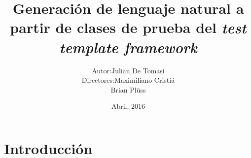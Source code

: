 \documentclass[pdf]{beamer}
\begin{document}
  
\title[NLG a partir de clases de prueba del TTF]{Generación de lenguaje natural a partir de clases de prueba del \textit{test template framework}}
\author[Julian De Tomasi]{\begin{tabular}{r@{ }l} 
  Autor:      & Julian De Tomasi \\[1ex]
  Directores: & Maximiliano Cristiá\\
  & Brian Plüss
  \end{tabular}}
\date{Abril, 2016}
  
\begin{frame}
  \titlepage
\end{frame}
  
  
\section{Introducción}
  
\end{document}
